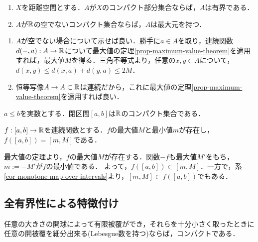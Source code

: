 \documentclass[uplatex,dvipdfmx]{jsreport}
\begin{document}
\begin{corollary}[距離空間のコンパクト集合]\label{cor-compact-sets-in-metric-space-is-bounded}\mbox{}
    \begin{enumerate}
        \item $X$を距離空間とする．$A$が$X$のコンパクト部分集合ならば，$A$は有界である．
        \item $A$が$\mathbb{R}$の空でないコンパクト集合ならば，$A$は最大元を持つ．
    \end{enumerate}
\end{corollary}
\begin{Proof}\mbox{}
    \begin{enumerate}
        \item $A$が空でない場合について示せば良い．勝手に$a\in A$を取り，連続関数$d(-,a):A\to\mathbb{R}$について最大値の定理\ref{prop-maximum-value-theorem}を適用すれば，最大値$M$を得る．三角不等式より，任意の$x,y\in A$について，$d(x,y)\le d(x,a)+d(y,a)\le 2M$．
        \item 恒等写像$A\to A\subset\mathbb{R}$は連続だから，これに最大値の定理\ref{prop-maximum-value-theorem}を適用すれば良い．
    \end{enumerate}
\end{Proof}
\begin{theorem}\label{thm-Heine-Borel}
    $a\le b$を実数とする．閉区間$[a,b]$は$\mathbb{R}$のコンパクト集合である．
\end{theorem}

\begin{corollary}
    $f:[a,b]\to\mathbb{R}$を連続関数とする．$f$の最大値$M$と最小値$m$が存在し，$f([a,b])=[m,M]$である．
\end{corollary}
\begin{Proof}
    最大値の定理より，$f$の最大値$M$が存在する．関数$-f$も最大値$M'$をもち，$m:=-M'$が$f$の最小値である．
    よって，$f([a,b])\subset[m,M]$．一方で，系\ref{cor-monotone-map-over-intervals}より，$[m,M]\subset f([a,b])$でもある．
\end{Proof}

\subsection{全有界性による特徴付け}

\begin{tcolorbox}[colframe=ForestGreen, colback=ForestGreen!10!white,breakable,colbacktitle=ForestGreen!40!white,coltitle=black,fonttitle=\bfseries\sffamily,
title=]
    任意の大きさの開球によって有限被覆ができ，それらを十分小さく取ったときに任意の開被覆を細分出来る(Lebesgue数を持つ)ならば，コンパクトである．
\end{tcolorbox}
\end{document}
